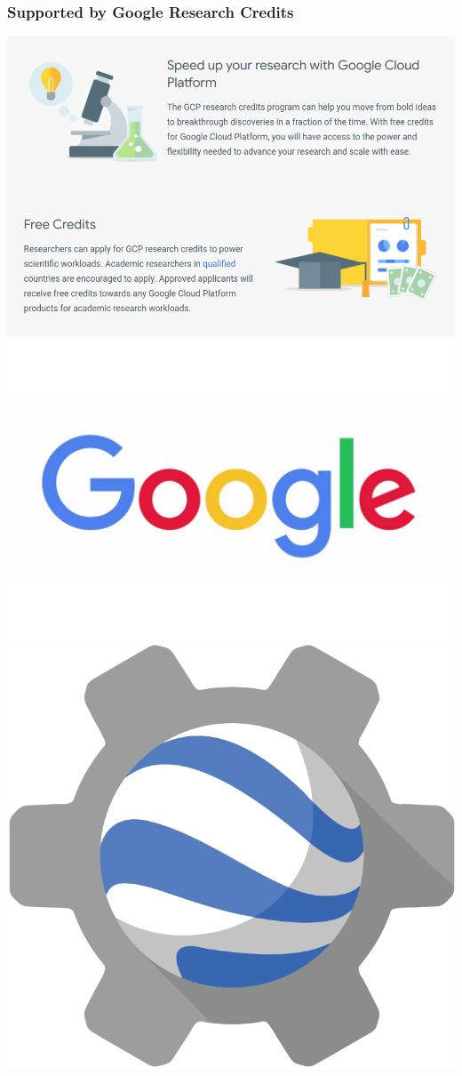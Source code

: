 \documentclass[%
  aspectratio=169,
  9pt,
  USenglish,
  titlegraphic, %
  affiliationintitlepagehead,
  affiliation,
]{beamer}
\begin{document}
\begin{frame}
\frametitle{Supported by Google Research Credits}

\includegraphics[width=.3\textwidth]{images/google_research_credits}
\includegraphics[width=.3\textwidth]{images/google}
\includegraphics[width=.2\textwidth]{images/earth-engine-logo}


\end{frame}
\end{document}
